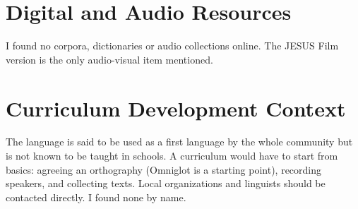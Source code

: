 \documentclass[12pt]{article}
\begin{document}
\section{Digital and Audio Resources}
I found no corpora, dictionaries or audio collections online. The JESUS Film version is the only audio-visual item mentioned.

\section{Curriculum Development Context}
The language is said to be used as a first language by the whole community but is not known to be taught in schools. A curriculum would have to start from basics: agreeing an orthography (Omniglot is a starting point), recording speakers, and collecting texts. Local organizations and linguists should be contacted directly. I found none by name.
\end{document}
